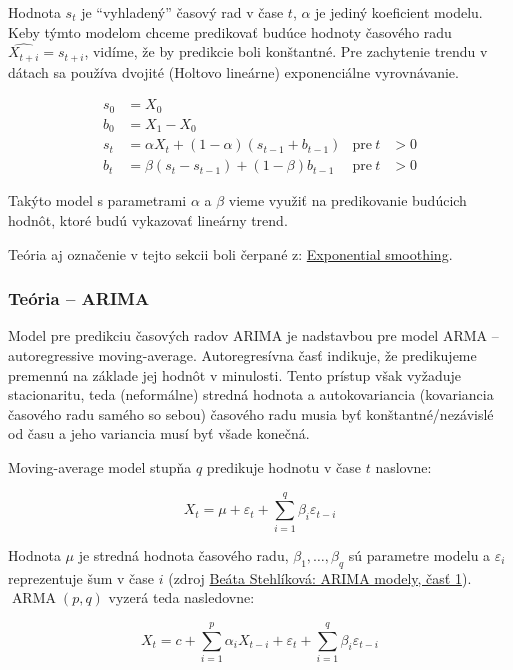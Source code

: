 \documentclass[main.tex]{subfiles}
\begin{document}
Hodnota $s_t$ je \enquote{vyhladený} časový rad v čase $t$, $\alpha$ je jediný koeficient modelu. Keby týmto modelom chceme predikovať budúce hodnoty časového radu $\widehat{X_{t+i}} = s_{t+i}$, vidíme, že by predikcie boli konštantné. Pre zachytenie trendu v dátach sa používa dvojité (Holtovo lineárne) exponenciálne vyrovnávanie.

\begin{align*}
	s_0 &= X_0 \\
	b_0 &= X_1 - X_0 \\
	s_t &= \alpha X_t + (1-\alpha) (s_{t-1} + b_{t-1}) & \text{pre}~t&>0 \\
	b_t &= \beta (s_t - s_{t-1}) + (1-\beta)b_{t-1} & \text{pre}~t&>0 
\end{align*}

Takýto model s parametrami $\alpha$ a $\beta$ vieme využiť na predikovanie budúcich hodnôt, ktoré budú vykazovať lineárny trend.

Teória aj označenie v tejto sekcii boli čerpané z: \href{https://en.wikipedia.org/wiki/Exponential_smoothing#}{Exponential smoothing}.

\subsubsection{Teória -- ARIMA} 

Model pre predikciu časových radov ARIMA je nadstavbou pre model ARMA -- autoregressive moving-average. Autoregresívna časť indikuje, že predikujeme premennú na základe jej hodnôt v minulosti. Tento prístup však vyžaduje stacionaritu, teda (neformálne) stredná hodnota a autokovariancia (kovariancia časového radu samého so sebou) časového radu musia byť konštantné/nezávislé od času a jeho variancia musí byť všade konečná. 

Moving-average model stupňa $q$ predikuje hodnotu v čase $t$ naslovne:

\begin{equation*}
	X_t = \mu + \varepsilon_t + \sum_{i=1}^{q}\beta_i\varepsilon_{t-i}
\end{equation*}

Hodnota $\mu$ je stredná hodnota časového radu, $\beta_1,\dots, \beta_q$ sú parametre modelu a $\varepsilon_i$ reprezentuje šum v čase $i$ (zdroj \href{http://www.iam.fmph.uniba.sk/institute/stehlikova/cr19/arima1.html#maq-proces-vyssieho-radu}{Beáta Stehlíková: ARIMA modely, časť 1}). $\operatorname{ARMA}(p, q)$ vyzerá teda nasledovne:

\begin{equation*}
	X_t = c + \sum_{i=1}^{p}\alpha_i X_{t-i} + \varepsilon_t + \sum_{i=1}^{q}\beta_i\varepsilon_{t-i}
\end{equation*}
\end{document}
